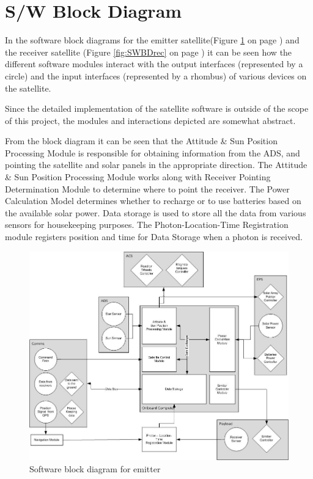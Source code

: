 \section{S/W Block Diagram}
\label{section_SWBD}

In the software block diagrams for the emitter satellite(Figure \ref{fig:SWBDemit} on page \pageref{fig:SWBDemit}) and the receiver satellite (Figure \ref{fig:SWBDrec} on page \pageref{fig:SWBDrec}) it can be seen how the different software modules interact with the output interfaces (represented by a circle) and the input interfaces (represented by a rhombus) of various devices on the satellite. 
 
Since the detailed implementation of the satellite software is outside of the scope of this project, the modules and interactions depicted are somewhat abstract.  

From the block diagram it can be seen that the Attitude \& Sun Position Processing Module is responsible for obtaining information from the \ac{ADS}, and pointing the satellite and solar panels in the appropriate direction. The Attitude \& Sun Position Processing Module works along with Receiver Pointing Determination Module to determine where to point the receiver. The Power Calculation Model determines whether to recharge or to use batteries based on the available solar power. Data storage is used to store all the data from various sensors for housekeeping purposes. The Photon-Location-Time Registration module registers position and time for Data Storage when a photon is received.

\begin{landscape}
\begin{figure}[ht!]
\centering
\includegraphics[width=1\textheight]{chapters/img/SWBDemit.jpg}
\caption{Software block diagram for emitter }
\label{fig:SWBDemit}
\end{figure}
\end{landscape}

